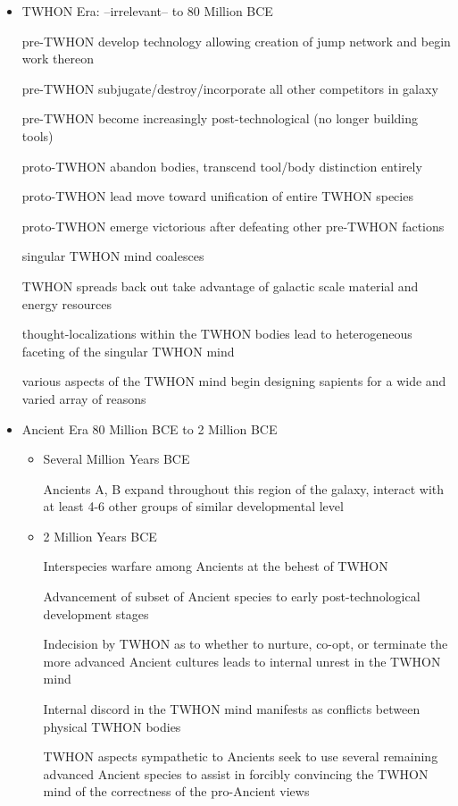 \begin{itemize}
\item TWHON Era: --irrelevant-- to 80 Million BCE

pre-TWHON develop technology allowing creation of jump network and
begin work thereon

pre-TWHON subjugate/destroy/incorporate all other competitors in
galaxy

pre-TWHON become increasingly post-technological (no longer building
tools)

proto-TWHON abandon bodies, transcend tool/body distinction entirely

proto-TWHON lead move toward unification of entire TWHON species

proto-TWHON emerge victorious after defeating other pre-TWHON factions

singular TWHON mind coalesces

TWHON spreads back out take advantage of galactic scale material and
energy resources

thought-localizations within the TWHON bodies lead to heterogeneous
faceting of the singular TWHON mind

various aspects of the TWHON mind begin designing sapients for a wide
and varied array of reasons

\item Ancient Era 80 Million BCE to 2 Million BCE
\begin{itemize}
\item	Several Million Years BCE 

Ancients A, B expand throughout this region of the galaxy, interact
with at least 4-6 other groups of similar developmental level

\item 2 Million Years BCE 

Interspecies warfare among Ancients at the behest of TWHON

Advancement of subset of Ancient species to early post-technological
development stages

Indecision by TWHON as to whether to nurture, co-opt, or terminate the
more advanced Ancient cultures leads to internal unrest in the TWHON
mind

Internal discord in the TWHON mind manifests as conflicts between
physical TWHON bodies

TWHON aspects sympathetic to Ancients seek to use several remaining
advanced Ancient species to assist in forcibly convincing the TWHON
mind of the correctness of the pro-Ancient views


\end{itemize}
\end{itemize}
